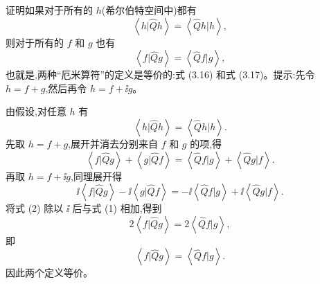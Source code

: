 \begin{question}
证明如果对于所有的 $h$(希尔伯特空间中)都有
\[
\left\langle h|\hat Q h \right\rangle=\left\langle \hat Q h|h \right\rangle,
\]
则对于所有的 $f$ 和 $g$ 也有
\[
\left\langle f|\hat Q g \right\rangle=\left\langle \hat Q f|g \right\rangle,
\]
也就是,两种“厄米算符”的定义是等价的:式 (3.16) 和式 (3.17)。提示:先令 $h=f+g$,然后再令 $h=f+\ii g$。

\par\smallskip
{}

\begin{solution}
由假设,对任意 $h$ 有
\[
\left\langle h|\hat Qh \right\rangle=\left\langle \hat Qh|h \right\rangle.
\]
先取 $h=f+g$,展开并消去分别来自 $f$ 和 $g$ 的项,得
\[
\left\langle f|\hat Q g \right\rangle+\left\langle g|\hat Q f \right\rangle
=\left\langle \hat Q f|g \right\rangle+\left\langle \hat Q g|f \right\rangle.\tag{1}
\]
再取 $h=f+\ii g$,同理展开得
\[
\ii\left\langle f|\hat Q g \right\rangle-\ii\left\langle g|\hat Q f \right\rangle
=-\ii\left\langle \hat Q f|g \right\rangle+\ii\left\langle \hat Q g|f \right\rangle.\tag{2}
\]
将式 (2) 除以 $\ii$ 后与式 (1) 相加,得到
\[
2\left\langle f|\hat Qg \right\rangle=2\left\langle \hat Q f|g \right\rangle,
\]
即
\[
\boxed{\left\langle f|\hat Qg \right\rangle=\left\langle \hat Q f|g \right\rangle}.
\]
因此两个定义等价。
\end{solution}
\end{question}

